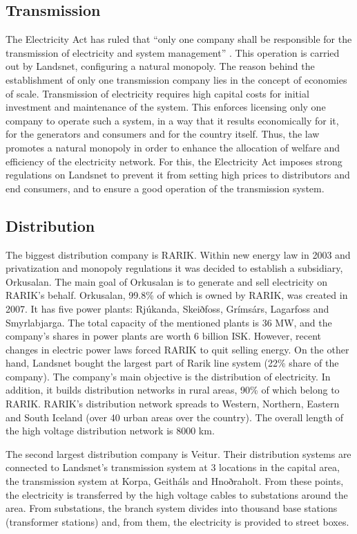 \documentclass[svn, final]{rureport}
\begin{document}
\subsection{Transmission}

The Electricity Act has ruled that “only one company shall be responsible for the transmission of electricity and system management” \cite{electricity_act_2003}. This operation is carried out by Landsnet, configuring a natural monopoly. The reason behind the establishment of only one transmission company lies in the concept of economies of scale. Transmission of electricity requires high capital costs for initial investment and maintenance of the system. This enforces licensing only one company to operate such a system, in a way that it results economically for it, for the generators and consumers and for the country itself. Thus, the law promotes a natural monopoly in order to enhance the allocation of welfare and efficiency of the electricity network. For this, the Electricity Act imposes strong regulations on Landsnet to prevent it from setting high prices to distributors and end consumers, and to ensure a good operation of the transmission system. 

\subsection{Distribution}

The biggest distribution company is RARIK. Within new energy law in 2003 and privatization and monopoly regulations it was decided to establish a subsidiary, Orkusalan. The main goal of Orkusalan is to generate and sell electricity on RARIK’s behalf. Orkusalan, 99.8\% of which is owned by RARIK, was created in 2007. It has five power plants: Rjúkanda, Skeiðfoss, Grímsárs, Lagarfoss and Smyrlabjarga. The total capacity of the mentioned plants is 36 MW, and the company’s shares in power plants are worth 6 billion ISK. However, recent changes in electric power laws forced RARIK to quit selling energy. On the other hand, Landsnet bought the largest part of Rarik line system (22\% share of the company). 
The company’s main objective is the distribution of electricity. In addition, it builds distribution networks in rural areas, 90\% of which belong to RARIK. RARIK’s distribution network spreads to Western, Northern, Eastern and South Iceland (over 40 urban areas over the country). The overall length of the high voltage distribution network is 8000 km. 

The second largest distribution company is Veitur. Their distribution systems are connected to Landsnet’s transmission system at 3 locations in the capital area, the transmission system at Korpa, Geitháls and Hnoðraholt. From these points, the electricity is transferred by the high voltage cables to substations around the area. From substations, the branch system divides into thousand base stations (transformer stations) and, from them, the electricity is provided to street boxes.
\end{document}
